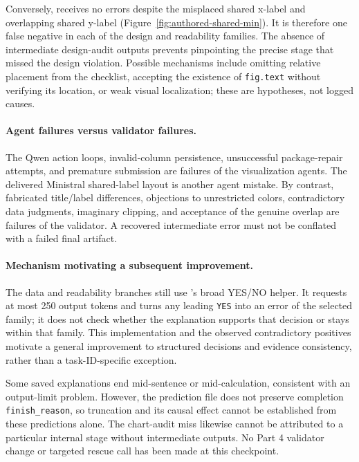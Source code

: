 \documentclass[11pt]{article}
\begin{document}
Conversely,  receives no errors despite
the misplaced shared x-label and overlapping shared y-label
(Figure~\ref{fig:authored-shared-min}).
It is therefore one false negative in each of the design and readability
families. The absence of intermediate design-audit outputs prevents
pinpointing the precise stage that missed the design violation.
Possible mechanisms include omitting relative placement from the checklist,
accepting the existence of \texttt{fig.text} without verifying its location,
or weak visual localization; these are hypotheses, not logged causes.

\paragraph{Agent failures versus validator failures.}
The Qwen action loops, invalid-column persistence, unsuccessful package-repair
attempts, and premature submission are failures of the visualization agents.
The delivered Ministral shared-label layout is another agent mistake.
By contrast, fabricated title/label differences, objections to unrestricted
colors, contradictory data judgments, imaginary clipping, and acceptance
of the genuine overlap are failures of the validator.
A recovered intermediate error must not be conflated with a failed final
artifact.

\paragraph{Mechanism motivating a subsequent improvement.}
The data and readability branches still use 's
broad YES/NO helper. It requests at most 250 output tokens and turns any
leading \texttt{YES} into an error of the selected family; it does not check
whether the explanation supports that decision or stays within that family.
This implementation and the observed contradictory positives motivate a
general improvement to structured decisions and evidence consistency,
rather than a task-ID-specific exception.

Some saved explanations end mid-sentence or mid-calculation, consistent with
an output-limit problem. However, the prediction file does not preserve
completion \texttt{finish\_reason}, so truncation and its causal effect
cannot be established from these predictions alone.
The chart-audit miss likewise cannot be attributed to a particular internal
stage without intermediate outputs.
No Part 4 validator change or targeted rescue call has been made at this
checkpoint.
\end{document}
